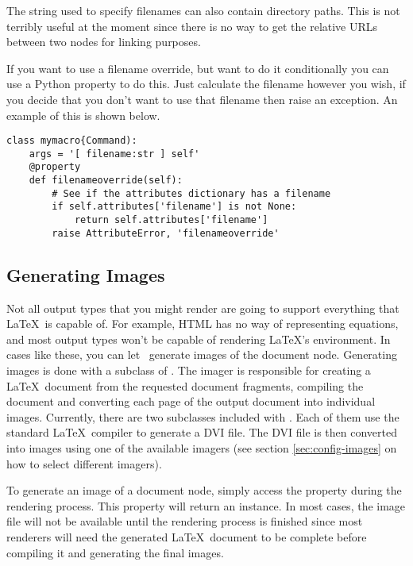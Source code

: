 The string used to specify filenames can also contain directory paths.
This is not terribly useful at the moment since there is no way to 
get the relative URLs between two nodes for linking purposes.

If you want to use a filename override, but want to do it conditionally
you can use a Python property to do this.  Just calculate the filename
however you wish, if you decide that you don't want to use that filename
then raise an  exception.  An example of this
is shown below.
\begin{verbatim}
class mymacro{Command):
    args = '[ filename:str ] self'
    @property
    def filenameoverride(self):
        # See if the attributes dictionary has a filename
        if self.attributes['filename'] is not None:
            return self.attributes['filename']
        raise AttributeError, 'filenameoverride'
\end{verbatim}


\subsection{Generating Images}

Not all output types that you might render are going to support everything
that \LaTeX\ is capable of.  For example, HTML has no way of representing
equations, and most output types won't be capable of rendering 
\LaTeX's  environment.  In cases like these, you
can let \plasTeX\ generate images of the document node.  Generating
images is done with a subclass of .
The imager is responsible for creating a \LaTeX\ document from the
requested document fragments, compiling the document and converting
each page of the output document into individual images.  Currently,
there are two  subclasses included with \plasTeX.
Each of them use the standard \LaTeX\ compiler to generate a DVI file.
The DVI file is then converted into images using one of the available
imagers (see section \ref{sec:config-images} on how to select different imagers).

To generate an image of a document node, simply access the 
property during the rendering process.  This property will return
an  instance.  In most cases, the image
file will not be available until the rendering process is finished
since most renderers will need the generated \LaTeX\ document to be
complete before compiling it and generating the final images.

